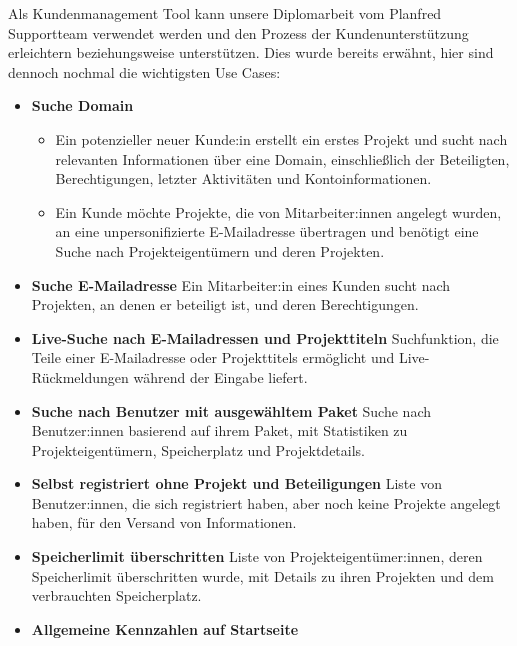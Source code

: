 Als Kundenmanagement Tool kann unsere Diplomarbeit vom Planfred Supportteam verwendet werden und den Prozess der Kundenunterstützung erleichtern beziehungsweise unterstützen.
Dies wurde bereits erwähnt, hier sind dennoch nochmal die wichtigsten Use Cases:

\begin{itemize}
    \item \textbf{Suche Domain}
        \begin{itemize}
            \item Ein potenzieller neuer Kunde:in erstellt ein erstes Projekt und sucht nach relevanten Informationen über eine Domain, einschließlich der Beteiligten, Berechtigungen, letzter Aktivitäten und Kontoinformationen.
            \item  Ein Kunde möchte Projekte, die von Mitarbeiter:innen angelegt wurden, an eine unpersonifizierte E-Mailadresse übertragen und benötigt eine Suche nach Projekteigentümern und deren Projekten.
        \end{itemize}
    \item \textbf{Suche E-Mailadresse}
        \newline
        Ein Mitarbeiter:in eines Kunden sucht nach Projekten, an denen er beteiligt ist, und deren Berechtigungen.
    \item \textbf{Live-Suche nach E-Mailadressen und Projekttiteln}
        \newline
        Suchfunktion, die Teile einer E-Mailadresse oder Projekttitels ermöglicht und Live-Rückmeldungen während der Eingabe liefert.
    \item \textbf{Suche nach Benutzer mit ausgewähltem Paket}
        \newline
        Suche nach Benutzer:innen basierend auf ihrem Paket, mit Statistiken zu Projekteigentümern, Speicherplatz und Projektdetails.
    \item \textbf{Selbst registriert ohne Projekt und Beteiligungen}
        \newline
        Liste von Benutzer:innen, die sich registriert haben, aber noch keine Projekte angelegt haben, für den Versand von Informationen.
    \item \textbf{Speicherlimit überschritten}
        \newline
        Liste von Projekteigentümer:innen, deren Speicherlimit überschritten wurde, mit Details zu ihren Projekten und dem verbrauchten Speicherplatz.
    \item \textbf{Allgemeine Kennzahlen auf Startseite}

\end{itemize}
